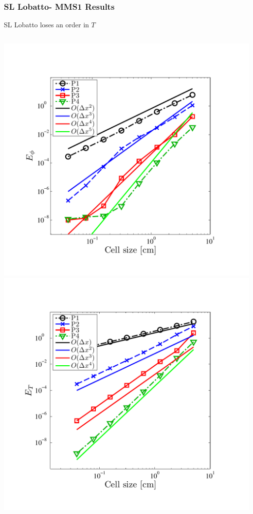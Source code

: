 \documentclass{beamer}
\begin{document}
\begin{frame}
\frametitle{SL Lobatto- MMS1 Results}
SL Lobatto loses an order in $T$
\begin{columns}[t]
\centering
\includegraphics[width=\textwidth,trim=0.25in  0.2in 0.75in 0.5in,clip=true]{../chapter6_grey_radtran/Dissertation_Data/MMS2_SLXS_Lobatto_phi_L2.pdf}
\centering
\includegraphics[width=\textwidth,trim=0.25in  0.2in 0.75in 0.5in,clip=true]{../chapter6_grey_radtran/Dissertation_Data/MMS2_SLXS_Lobatto_temp_L2.pdf}
\end{columns}
\end{frame}
\end{document}
